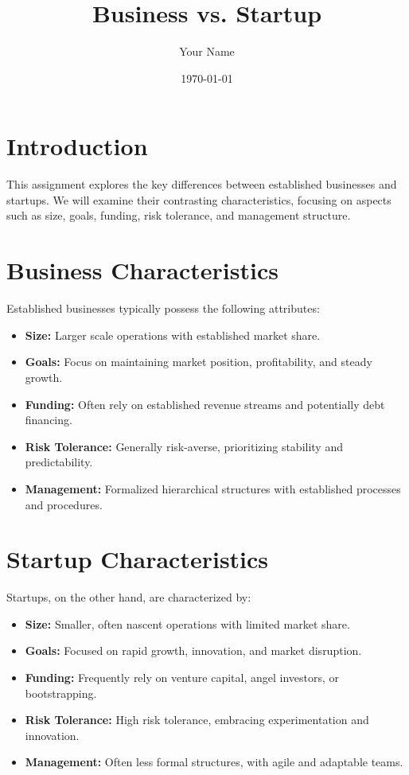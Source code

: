 \documentclass{article}
\title{Business vs. Startup}
\author{Your Name}
\date{\today}
\begin{document}
\maketitle

\section{Introduction}

This assignment explores the key differences between established businesses and startups.  We will examine their contrasting characteristics, focusing on aspects such as size, goals, funding, risk tolerance, and management structure.

\section{Business Characteristics}

Established businesses typically possess the following attributes:

\begin{itemize}
    \item \textbf{Size:} Larger scale operations with established market share.
    \item \textbf{Goals:} Focus on maintaining market position, profitability, and steady growth.
    \item \textbf{Funding:}  Often rely on established revenue streams and potentially debt financing.
    \item \textbf{Risk Tolerance:}  Generally risk-averse, prioritizing stability and predictability.
    \item \textbf{Management:} Formalized hierarchical structures with established processes and procedures.
\end{itemize}

\section{Startup Characteristics}

Startups, on the other hand, are characterized by:

\begin{itemize}
    \item \textbf{Size:} Smaller, often nascent operations with limited market share.
    \item \textbf{Goals:} Focused on rapid growth, innovation, and market disruption.
    \item \textbf{Funding:}  Frequently rely on venture capital, angel investors, or bootstrapping.
    \item \textbf{Risk Tolerance:}  High risk tolerance, embracing experimentation and innovation.
    \item \textbf{Management:} Often less formal structures, with agile and adaptable teams.
\end{itemize}
\end{document}
